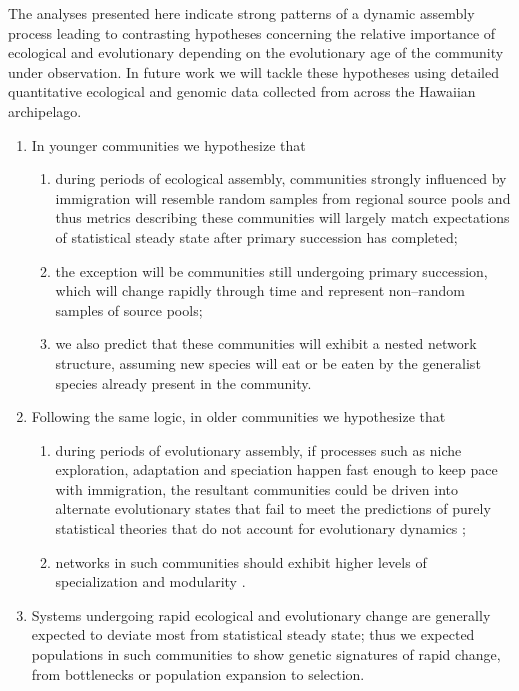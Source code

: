\documentclass[12pt]{article}
\begin{document}
\begin{linenumbers}
The analyses presented here indicate strong patterns of a dynamic
assembly process leading to contrasting hypotheses concerning the
relative importance of ecological and evolutionary depending on the
evolutionary age of the community under observation. In future work we
will tackle these hypotheses using detailed quantitative ecological
and genomic data collected from across the Hawaiian archipelago.
\begin{enumerate}
\item In younger communities we hypothesize that
  \begin{enumerate}
  \item during periods of ecological assembly, communities strongly
    influenced by immigration will resemble random samples from
    regional source pools and thus metrics describing these
    communities will largely match expectations of statistical steady
    state after primary succession has completed;
  \item the exception will be communities still undergoing primary
    succession, which will change rapidly through time
    and represent non--random samples of source pools;
  \item we also predict that these communities will exhibit a nested
    network structure, assuming new species will eat or be eaten by
    the generalist species \citep{Bascompte2003} already present in
    the community.
  \end{enumerate}
\item Following the same logic, in older communities we hypothesize
  that
  \begin{enumerate}
  \item during periods of evolutionary assembly, if processes such as
    niche exploration, adaptation and speciation happen fast enough to
    keep pace with immigration, the resultant communities could be
    driven into alternate evolutionary states that fail to meet the
    predictions of purely statistical theories that do not account for
    evolutionary dynamics \citep{harte2011};
  \item networks in such communities should exhibit higher levels of
    specialization and modularity \citep{Bascompte2007, Donatti2011,
      Nuismer2013}.
  \end{enumerate}
\item Systems undergoing rapid ecological and evolutionary change are
  generally expected to deviate most from statistical steady state;
  thus we expected populations in such communities to show genetic
  signatures of rapid change, from bottlenecks or population expansion
  to selection.
\end{enumerate}


\end{linenumbers}
\end{document}
